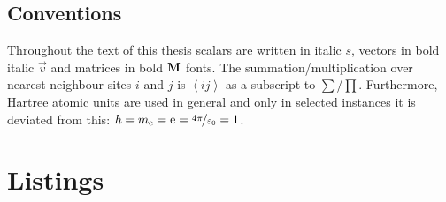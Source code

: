 \documentclass[ 10pt,
                DIV=10,
                headtopline=0.08em,
                headsepline=0.04em,
                headinclude,
                BCOR=6mm
              ]{scrbook}
\begin{document}
    
	\frontmatter
    
    {\hypersetup{hidelinks}\tableofcontents}%

    \clearpage
    \printglossaries

    
    

    \section*{Conventions}
    Throughout the text of this thesis scalars are written in italic $s$, vectors in bold italic $\vec v$ and matrices in bold $\textbf M$ fonts. The summation/multiplication over nearest neighbour sites $i$ and $j$ is $\left\langle ij \right\rangle$ as a subscript to $\sum$/$\prod$. Furthermore, Hartree atomic units are used in general and only in selected instances it is deviated from this: $\hbar = m_\mathrm{e} = \mathrm e = \nicefrac{4\pi}{\varepsilon_0} = 1$. 
    \newpage
    \nonfrenchspacing

    \mainmatter
    \renewcommand{\thechapter}{\Roman{chapter}}
    

    

    

    

    \cleardoublepage
    \printbibliography

    \chapter*{Listings}
    \listoffigures
    \listoftables
\end{document}
